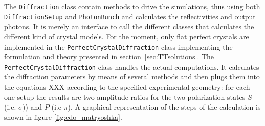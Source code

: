 \documentclass[preprint]{iucr}              %
\begin{document}
The {\tt Diffraction} class contain methods to drive the simulations, thus using both {\tt DiffractionSetup} and {\tt PhotonBunch} and calculates the reflectivities and output photons. It is merely an interface to call the different classes that calculates the different kind of crystal models. For the moment, only flat perfect crystals are implemented in the {\tt PerfectCrystalDiffraction} class implementing the formulation and theory presented in section~\ref{sec:TTsolutions}. The {\tt PerfectCrystalDiffraction} class handles the actual computations. It calculates the diffraction parameters by means of
several methods and then plugs them into the equations XXX according to the specified experimental geometry: for each
one setup the results are two amplitude ratios for the two polarization
states $S$ (i.e. $\sigma)$) and $P$ (i.e $\pi$). A graphical representation of the steps
of the calculation is shown in figure \ref{fig:edo_matryoshka}.



\end{document}
